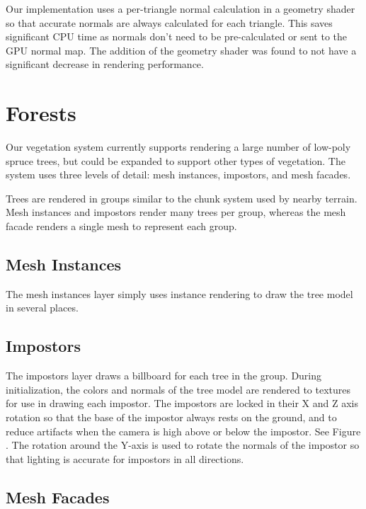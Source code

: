 Our implementation uses a per-triangle normal calculation in a geometry shader so that accurate normals are always calculated for each triangle.
This saves significant CPU time as normals don't need to be pre-calculated or sent to the GPU normal map.
The addition of the geometry shader was found to not have a significant decrease in rendering performance.


\section{Forests} \label{forests} %

Our vegetation system currently supports rendering a large number of low-poly spruce trees, but could be expanded to support other types of vegetation.
The system uses three levels of detail: mesh instances, impostors, and mesh facades.

Trees are rendered in groups similar to the chunk system used by nearby terrain.
Mesh instances and impostors render many trees per group, whereas the mesh facade renders a single mesh to represent each group.

\subsection{Mesh Instances}

The mesh instances layer simply uses instance rendering to draw the tree model in several places.

\subsection{Impostors}

The impostors layer draws a billboard for each tree in the group.
During initialization, the colors and normals of the tree model are rendered to textures for use in drawing each impostor.
The impostors are locked in their X and Z axis rotation so that the base of the impostor always rests on the ground, and to reduce artifacts when the camera is high above or below the impostor.
See Figure .
The rotation around the Y-axis is used to rotate the normals of the impostor so that lighting is accurate for impostors in all directions.

\subsection{Mesh Facades}

